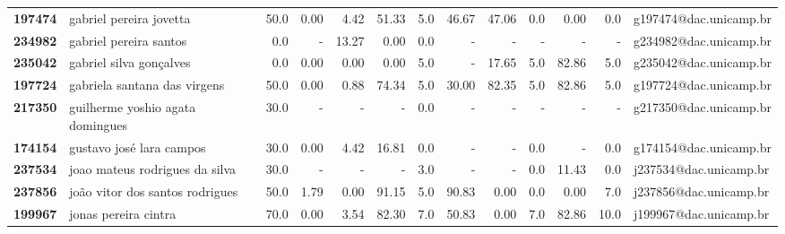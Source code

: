 \documentclass[11pt]{article}
\begin{document}
\begin{longtable}{llrrrrrrrrrrl}
\textbf{197474} &                gabriel pereira jovetta &                  50.0 &        0.00 &        4.42 &       51.33 &                      5.0 &       46.67 &       47.06 &                        0.0 &        0.00 &                      0.0 &  g197474@dac.unicamp.br \\
\textbf{234982} &                 gabriel pereira santos &                   0.0 &           - &       13.27 &        0.00 &                      0.0 &           - &           - &                          - &           - &                        - &  g234982@dac.unicamp.br \\
\textbf{235042} &                gabriel silva gonçalves &                   0.0 &        0.00 &        0.00 &        0.00 &                      5.0 &           - &       17.65 &                        5.0 &       82.86 &                      5.0 &  g235042@dac.unicamp.br \\
\textbf{197724} &           gabriela santana das virgens &                  50.0 &        0.00 &        0.88 &       74.34 &                      5.0 &       30.00 &       82.35 &                        5.0 &       82.86 &                      5.0 &  g197724@dac.unicamp.br \\
\textbf{217350} &       guilherme yoshio agata domingues &                  30.0 &           - &           - &           - &                      0.0 &           - &           - &                          - &           - &                        - &  g217350@dac.unicamp.br \\
\textbf{174154} &               gustavo josé lara campos &                  30.0 &        0.00 &        4.42 &       16.81 &                      0.0 &           - &           - &                        0.0 &           - &                      0.0 &  g174154@dac.unicamp.br \\
\textbf{237534} &         joao mateus rodrigues da silva &                  30.0 &           - &           - &           - &                      3.0 &           - &           - &                        0.0 &       11.43 &                      0.0 &  j237534@dac.unicamp.br \\
\textbf{237856} &        joão vitor dos santos rodrigues &                  50.0 &        1.79 &        0.00 &       91.15 &                      5.0 &       90.83 &        0.00 &                        0.0 &        0.00 &                      7.0 &  j237856@dac.unicamp.br \\
\textbf{199967} &                   jonas pereira cintra &                  70.0 &        0.00 &        3.54 &       82.30 &                      7.0 &       50.83 &        0.00 &                        7.0 &       82.86 &                     10.0 &  j199967@dac.unicamp.br \\

\end{longtable}
\end{document}
